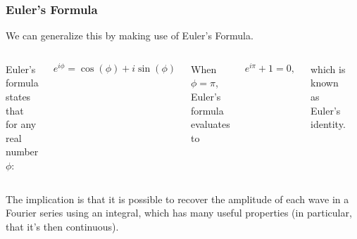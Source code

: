 \documentclass[hyperref={colorlinks=true}]{beamer}
\begin{document}
\begin{frame}%
  \frametitle{Euler's Formula}

  We can generalize this by making use of Euler's Formula.
  
  \begin{columns}
  
  
  Euler's formula states that for any real number $\phi$: 
  
  \begin{equation}
    e^{i\phi} = \cos(\phi) + i\sin(\phi)
  \end{equation}
  
  When $\phi=\pi$, Euler's formula evaluates to 
  
  \begin{equation}
    e^{i\pi }+1=0,
  \end{equation} 
  
  which is known as Euler's identity. 
  
  
  \begin{figure}
    \includegraphics[width=0.9\columnwidth]{Eulers_formula.png}
  \end{figure}
  
  \end{columns}
  
  The implication is that it is possible to recover the amplitude of each wave in a Fourier series using an integral, which has many useful properties (in particular, that it's then continuous).

\end{frame}
\end{document}
